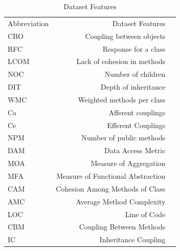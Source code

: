 \begin{table}[!htp]\centering
\caption{Dataset Features}\label{tab: }
\scriptsize
\begin{tabular}{lrr}\toprule
Abbreviation &Dataset Features \\
CBO &Coupling between objects \\\midrule
RFC &Response for a class \\
LCOM &Lack of cohesion in methods \\
NOC &Number of children \\
DIT &Depth of inheritance \\
WMC &Weighted methods per class \\
Ca &Afferent couplings \\
Ce &Efferent Couplings \\
NPM &Number of public methods \\
DAM &Data Access Metric \\
MOA &Measure of Aggregation \\
MFA &Measure of Functional Abstraction \\
CAM &Cohesion Among Methods of Class \\
AMC &Average Method Complexity \\
LOC &Line of Code \\
CBM &Coupling Between Methods \\
IC &Inheritance Coupling \\
\bottomrule
\end{tabular}
\end{table}

